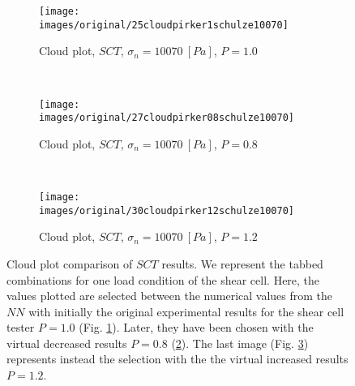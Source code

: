 \begin{figure}[htp] \centering
    \begin{subfigure}[b]{0.96\columnwidth}
        \texttt{[image: images/original/25cloudpirker1schulze10070]}
        \caption{Cloud plot, $SCT$, $\sigma_n=10070 ~[Pa]$, $P=1.0$}
        \label{fig:25cloudpirker1schulze10070}
    \end{subfigure}\\
    \begin{subfigure}[b]{0.96\columnwidth}
        \texttt{[image: images/original/27cloudpirker08schulze10070]}
        \caption{Cloud plot, $SCT$, $\sigma_n=10070 ~[Pa]$, $P=0.8$}
        \label{fig:27cloudpirker08schulze10070} 
    \end{subfigure}\\
    \begin{subfigure}[b]{0.96\columnwidth}
        \texttt{[image: images/original/30cloudpirker12schulze10070]}
        \caption{Cloud plot, $SCT$, $\sigma_n=10070 ~[Pa]$, $P=1.2$}
        \label{fig:30cloudpirker12schulze10070} 
    \end{subfigure}
    \caption[Cloud plot comparison of SCT results]{Cloud plot comparison of
    $SCT$ results. We represent the tabbed combinations for one load condition
    of the shear cell. 
    Here, the values plotted are selected between the numerical
    values from the $NN$ with initially the original experimental results for the shear cell tester $P=1.0$ (Fig.
    \ref{fig:25cloudpirker1schulze10070}). 
        Later, they have been chosen with  
    the virtual decreased results $P=0.8$
    (\ref{fig:27cloudpirker08schulze10070}).
    The last image (Fig. \ref{fig:30cloudpirker12schulze10070}) represents
    instead the selection with the the virtual increased results $P=1.2$.    }
    \label{fig:29schulzeradarandcloud}
\end{figure}